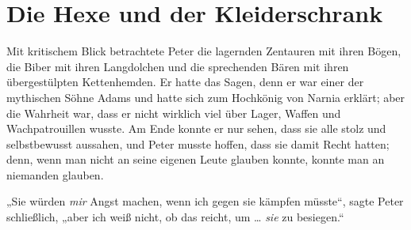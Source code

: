 \section{Die Hexe und der Kleiderschrank}

Mit kritischem Blick betrachtete Peter die lagernden Zentauren mit ihren Bögen, die Biber mit ihren Langdolchen und die sprechenden Bären mit ihren übergestülpten Kettenhemden. Er hatte das Sagen, denn er war einer der mythischen Söhne Adams und hatte sich zum Hochkönig von Narnia erklärt; aber die Wahrheit war, dass er nicht wirklich viel über Lager, Waffen und Wachpatrouillen wusste. Am Ende konnte er nur sehen, dass sie alle stolz und selbstbewusst aussahen, und Peter musste hoffen, dass sie damit Recht hatten; denn, wenn man nicht an seine eigenen Leute glauben konnte, konnte man an niemanden glauben.

„Sie würden \emph{mir} Angst machen, wenn ich gegen sie kämpfen müsste“, sagte Peter schließlich, „aber ich weiß nicht, ob das reicht, um … \emph{sie} zu besiegen.“

